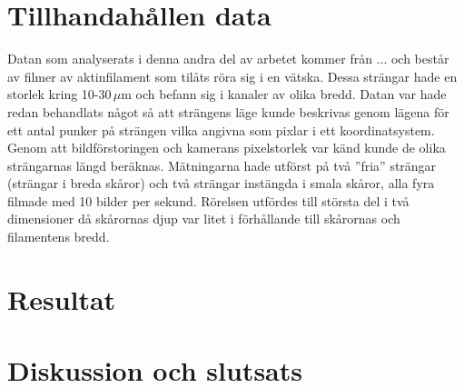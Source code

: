 \section{Tillhandahållen data}

Datan som analyserats i denna andra del av arbetet kommer från ... och består av filmer av aktinfilament som tilåts röra sig i en vätska. Dessa strängar hade en storlek kring 10-30\,$\mu$m och befann sig i kanaler av olika bredd. Datan var hade redan behandlats något så att strängens läge kunde beskrivas genom lägena för ett antal punker på strängen vilka angivna som pixlar i ett koordinatsystem. Genom att bildförstoringen och kamerans pixelstorlek var känd kunde de olika strängarnas längd beräknas. Mätningarna hade utförst på två ''fria'' strängar (strängar i breda skåror) och två strängar instängda i smala skåror, alla fyra filmade med 10 bilder per sekund. Rörelsen utfördes till största del i två dimensioner då skårornas djup var litet i förhållande till skårornas och filamentens bredd.

\section{Resultat}



\section{Diskussion och slutsats}